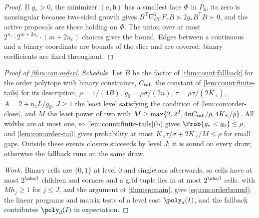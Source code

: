 \begin{proof}
If $g_*>0$, the minimizer $(a,\mathsf b)$ has a smallest face $\Phi$ in
$P_{\mathsf b}$, its zero is nonsingular because two-sided growth gives
$B^{\mathsf T}\nabla^2_{CC}F_\gamma B\succeq2g_*B^{\mathsf T}B\succ0$, and the
active proposals are those holding on $\Phi$. The union over at most
$2^{n_z}\cdot2^{m+2n_c}\cdot(m+2n_c)$ choices gives the bound. Edges between a continuous and a binary coordinate are bounds of the
slice and are covered; binary coefficients are fixed throughout.
\end{proof}

\begin{proof}[Proof of \cref{thm:con:order}]
\emph{Schedule.} Let $B$ be the factor of \cref{thm:count:fallback} for the
order polytope with binary constraints, $C_{\rm tail}$ the constant of
\cref{lem:count:finite-tails} for its description, $\rho=1/(4B)$,
$g_0=\rho\sigma/(2n)$, $\tau=\rho\sigma/(2K_\preceq)$, $A=2+n_c\bar L/g_0$, $J\ge1$
the least level satisfying the condition of \cref{lem:con:order-close}, and
$M$ the least power of two with
$M\ge\max\{2,2^J,4nC_{\rm tail}/\rho,4K_\preceq/\rho\}$. All widths are at most
one, so \cref{lem:count:finite-tails}(b) gives $\Prob\{g_*<g_0\}\le\rho$, and
\cref{lem:con:order-tail} gives probability at most
$K_\preceq\tau/\sigma+2K_\preceq/M\le\rho$ for small gaps. Outside these events
closure succeeds by level $J$; it is sound on every draw; otherwise the
fallback runs on the same draw.

\emph{Work.} Binary cells are $\{0,1\}$ at level $0$ and singletons
afterwards, so cells have at most $2^{\abs\beta}$ children and corners and a
grid tuple lies in at most $2^{\abs\beta}$ cells. 
with $Mh_j\ge1$ for $j\le J$, and the argument of \cref{thm:sp:main}, give
\eqref{eq:con:orderbound}; the linear programs and matrix tests of a level
cost $\poly_d(I)$, and the fallback contributes $\poly_d(I)$ in expectation.


\end{proof}
